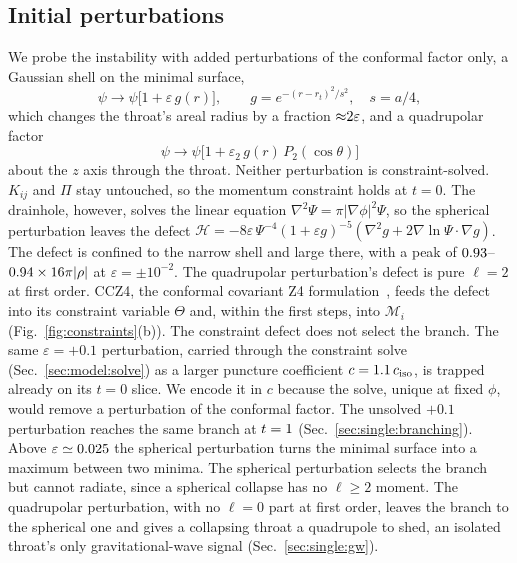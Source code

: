 \documentclass[twocolumn,floatfix,aps,prd,superscriptaddress,nofootinbib,showkeys]{revtex4-2}
\begin{document}
\subsection{Initial perturbations}
\label{sec:model:seeds}

We probe the instability with added perturbations of the conformal factor only, a Gaussian shell on the minimal surface,
\begin{equation}
\psi \to \psi\bigl[1 + \varepsilon\, g(r)\bigr],\qquad
g = e^{-(r-r_t)^2/s^2},\quad s = a/4,
\label{eq:seed}
\end{equation}
which changes the throat's areal radius by a fraction ${\approx}2\varepsilon$, and a quadrupolar factor
\begin{equation}
\psi \to \psi\bigl[1 + \varepsilon_2\, g(r)\,P_2(\cos\theta)\bigr]
\end{equation}
about the $z$ axis through the throat. Neither perturbation is constraint-solved. $K_{ij}$ and $\Pi$ stay untouched, so the momentum constraint holds at $t=0$. The drainhole, however, solves the linear equation $\nabla^2\Psi=\pi|\nabla\phi|^2\Psi$, so the spherical perturbation leaves the defect $\mathcal H=-8\varepsilon\,\Psi^{-4}(1+\varepsilon g)^{-5}(\nabla^2g+2\nabla\ln\Psi\cdot\nabla g)$. The defect is confined to the narrow shell and large there, with a peak of $0.93$--$0.94\times16\pi|\rho|$ at $\varepsilon=\pm10^{-2}$. The quadrupolar perturbation's defect is pure $\ell=2$ at first order. CCZ4, the conformal covariant Z4 formulation~\cite{alic2012}, feeds the defect into its constraint variable $\Theta$ and, within the first steps, into $\mathcal M_i$ (Fig.~\ref{fig:constraints}(b)). The constraint defect does not select the branch. The same $\varepsilon=+0.1$ perturbation, carried through the constraint solve (Sec.~\ref{sec:model:solve}) as a larger puncture coefficient $c=1.1\,c_{\rm iso}$, is trapped already on its $t=0$ slice. We encode it in $c$ because the solve, unique at fixed $\phi$, would remove a perturbation of the conformal factor. The unsolved $+0.1$ perturbation reaches the same branch at $t=1$ (Sec.~\ref{sec:single:branching}). Above $\varepsilon\simeq0.025$ the spherical perturbation turns the minimal surface into a maximum between two minima. The spherical perturbation selects the branch but cannot radiate, since a spherical collapse has no $\ell\ge2$ moment. The quadrupolar perturbation, with no $\ell=0$ part at first order, leaves the branch to the spherical one and gives a collapsing throat a quadrupole to shed, an isolated throat's only gravitational-wave signal (Sec.~\ref{sec:single:gw}).
\end{document}
